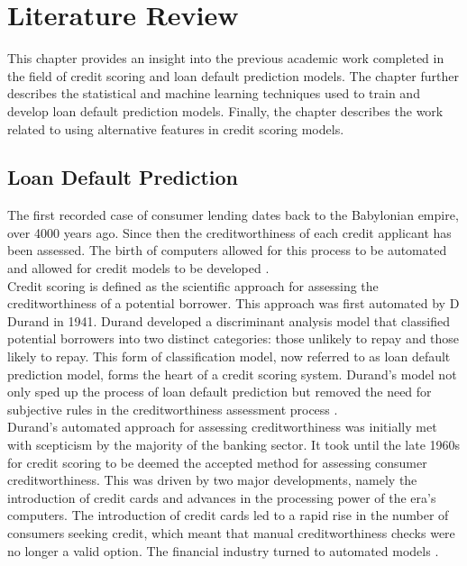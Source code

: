 \chapter{Literature Review} 
\label{Chapter2}

This chapter provides an insight into the previous academic work completed in the field of credit scoring and loan default prediction models. The chapter further describes the statistical and machine learning techniques used to train and develop loan default prediction models. Finally, the chapter describes the work related to using alternative features in credit scoring models. 


\section{Loan Default Prediction}

The first recorded case of consumer lending dates back to the Babylonian empire, over 4000 years ago. Since then the creditworthiness of each credit applicant has been assessed. The birth of computers allowed for this process to be automated and allowed for credit models to be developed \parencite{CreditScoringIntroLewis}. \\

Credit scoring is defined as the scientific approach for assessing the creditworthiness of a potential borrower. This approach was first automated by D Durand in 1941. Durand developed a discriminant analysis model that classified potential borrowers into two distinct categories: those unlikely to repay and those likely to repay. This form of classification model, now referred to as loan default prediction model, forms the heart of a credit scoring system. Durand's model not only sped up the process of loan default prediction but removed the need for subjective rules in the creditworthiness assessment process \parencite{CreditScoringIntroThomas}. \\

Durand's automated approach for assessing creditworthiness was initially met with scepticism by the majority of the banking sector. It took until the late 1960s for credit scoring to be deemed the accepted method for assessing consumer creditworthiness. This was driven by two major developments, namely the introduction of credit cards and advances in the processing power of the era's computers. The introduction of credit cards led to a rapid rise in the number of consumers seeking credit, which meant that manual creditworthiness checks were no longer a valid option. The financial industry turned to automated models \parencite{CreditScoringIntroMarquez}. \\

